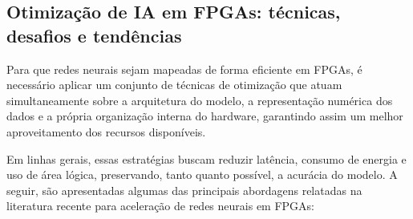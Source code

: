 %
%
%





\subsection{Otimização de IA em FPGAs: técnicas, desafios e tendências}

Para que redes neurais sejam mapeadas de forma eficiente em FPGAs, é necessário aplicar um conjunto de técnicas de otimização que atuam simultaneamente sobre a arquitetura do modelo, a representação numérica dos dados e a própria organização interna do hardware, garantindo assim um melhor aproveitamento dos recursos disponíveis.

Em linhas gerais, essas estratégias buscam reduzir latência, consumo de energia e uso de área lógica, preservando, tanto quanto possível, a acurácia do modelo. A seguir, são apresentadas algumas das principais abordagens relatadas na literatura recente para aceleração de redes neurais em FPGAs:

